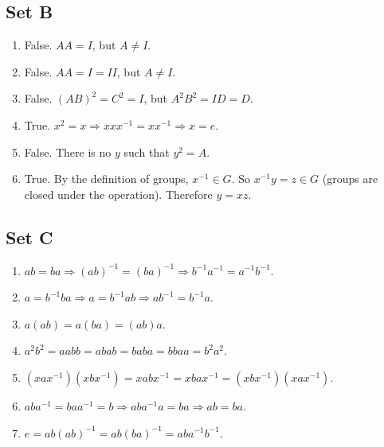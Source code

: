 \documentclass{article}
\begin{document}
\subsection{Set B}
\begin{enumerate}
    \item False. $AA = I$, but $A \ne I$.
    \item False. $AA = I = II$, but $A \ne I$.
    \item False. $(AB)^2 = C^2 = I$, but $A^2B^2 = ID = D$.
    \item True. $x^2 = x \Rightarrow xxx^{-1} = xx^{-1} \Rightarrow x = e$.
    \item False. There is no $y$ such that $y^2 = A$.
    \item True. By the definition of groups, $x^{-1} \in G$. So $x^{-1}y = z \in G$ (groups are closed under the operation). Therefore $y = xz$. 
\end{enumerate}

\subsection{Set C}
\begin{enumerate}
    \item $ab = ba \Rightarrow (ab)^{-1} = (ba)^{-1} \Rightarrow b^{-1}a^{-1} = a^{-1}b^{-1}$.
    \item $a = b^{-1}ba \Rightarrow a = b^{-1}ab \Rightarrow ab^{-1} = b^{-1}a$.
    \item $a(ab) = a(ba) = (ab)a$.
    \item $a^2b^2 = aabb = abab = baba = bbaa = b^2a^2$.
    \item $(xax^{-1})(xbx^{-1}) = xabx^{-1} = xbax^{-1} = (xbx^{-1})(xax^{-1})$.
    \item $aba^{-1} = baa^{-1} = b \Rightarrow aba^{-1}a = ba \Rightarrow ab = ba$.
    \item $e = ab(ab)^{-1} = ab(ba)^{-1} = aba^{-1}b^{-1}$.
\end{enumerate}
\end{document}
